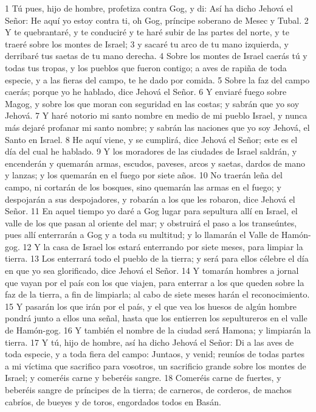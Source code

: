 1 Tú pues, hijo de hombre, profetiza contra Gog, y di: Así ha dicho Jehová el Señor: He aquí yo estoy contra ti, oh Gog, príncipe soberano de Mesec y Tubal.
2 Y te quebrantaré, y te conduciré y te haré subir de las partes del norte, y te traeré sobre los montes de Israel;
3 y sacaré tu arco de tu mano izquierda, y derribaré tus saetas de tu mano derecha.
4 Sobre los montes de Israel caerás tú y todas tus tropas, y los pueblos que fueron contigo; a aves de rapiña de toda especie, y a las fieras del campo, te he dado por comida.
5 Sobre la faz del campo caerás; porque yo he hablado, dice Jehová el Señor.
6 Y enviaré fuego sobre Magog, y sobre los que moran con seguridad en las costas; y sabrán que yo soy Jehová.
7 Y haré notorio mi santo nombre en medio de mi pueblo Israel, y nunca más dejaré profanar mi santo nombre; y sabrán las naciones que yo soy Jehová, el Santo en Israel.
8 He aquí viene, y se cumplirá, dice Jehová el Señor; este es el día del cual he hablado.
9 Y los moradores de las ciudades de Israel saldrán, y encenderán y quemarán armas, escudos, paveses, arcos y saetas, dardos de mano y lanzas; y los quemarán en el fuego por siete años.
10 No traerán leña del campo, ni cortarán de los bosques, sino quemarán las armas en el fuego; y despojarán a sus despojadores, y robarán a los que les robaron, dice Jehová el Señor.
11 En aquel tiempo yo daré a Gog lugar para sepultura allí en Israel, el valle de los que pasan al oriente del mar; y obstruirá el paso a los transeúntes, pues allí enterrarán a Gog y a toda su multitud; y lo llamarán el Valle de Hamón-gog.
12 Y la casa de Israel los estará enterrando por siete meses, para limpiar la tierra.
13 Los enterrará todo el pueblo de la tierra; y será para ellos célebre el día en que yo sea glorificado, dice Jehová el Señor.
14 Y tomarán hombres a jornal que vayan por el país con los que viajen, para enterrar a los que queden sobre la faz de la tierra, a fin de limpiarla; al cabo de siete meses harán el reconocimiento.
15 Y pasarán los que irán por el país, y el que vea los huesos de algún hombre pondrá junto a ellos una señal, hasta que los entierren los sepultureros en el valle de Hamón-gog.
16 Y también el nombre de la ciudad será Hamona; y limpiarán la tierra.
17 Y tú, hijo de hombre, así ha dicho Jehová el Señor: Di a las aves de toda especie, y a toda fiera del campo: Juntaos, y venid; reuníos de todas partes a mi víctima que sacrifico para vosotros, un sacrificio grande sobre los montes de Israel; y comeréis carne y beberéis sangre.
18 Comeréis carne de fuertes, y beberéis sangre de príncipes de la tierra; de carneros, de corderos, de machos cabríos, de bueyes y de toros, engordados todos en Basán.
